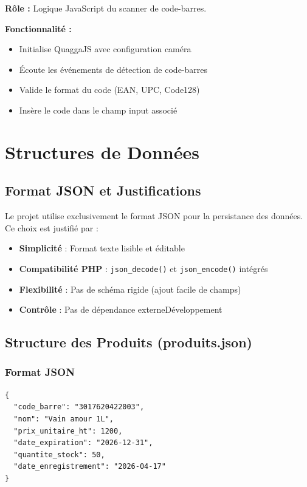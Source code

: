 \documentclass[12pt,a4paper]{report}
\begin{document}
\textbf{Rôle :} Logique JavaScript du scanner de code-barres.

\textbf{Fonctionnalité :}
\begin{itemize}
    \item Initialise QuaggaJS avec configuration caméra
    \item Écoute les événements de détection de code-barres
    \item Valide le format du code (EAN, UPC, Code128)
    \item Insère le code dans le champ input associé
\end{itemize}

\chapter{Structures de Données}

\section{Format JSON et Justifications}

Le projet utilise exclusivement le format JSON pour la persistance des données. Ce choix est justifié par :

\begin{itemize}
    \item \textbf{Simplicité} : Format texte lisible et éditable
    \item \textbf{Compatibilité PHP} : \texttt{json\_decode()} et \texttt{json\_encode()} intégrés
    \item \textbf{Flexibilité} : Pas de schéma rigide (ajout facile de champs)
    \item \textbf{Contrôle} : Pas de dépendance externeDéveloppement
\end{itemize}

\section{Structure des Produits (produits.json)}

\subsection{Format JSON}

\begin{lstlisting}
{
  "code_barre": "3017620422003",
  "nom": "Vain amour 1L",
  "prix_unitaire_ht": 1200,
  "date_expiration": "2026-12-31",
  "quantite_stock": 50,
  "date_enregistrement": "2026-04-17"
}
\end{lstlisting}
\end{document}
